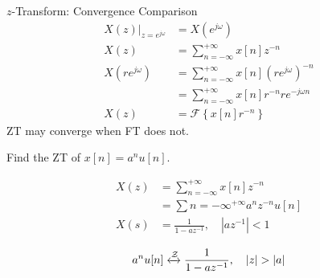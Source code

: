 \begin{frame}{$z$-Transform: Convergence Comparison}
    \begin{align*}
        \left.X(z)\right|_{z=e^{j\omega}} &= X(e^{j\omega})\\
        X(z) &= \sum_{n=-\infty}^{+\infty}x[n]z^{-n}\\
        X(re^{j\omega}) &= \sum_{n=-\infty}^{+\infty}x[n]\left(re^{j\omega}\right)^{-n}\\
        &= \sum_{n=-\infty}^{+\infty}x[n]r^{-n}re^{-j\omega n}\\
        X(z) &= \mathcal{F}\left\{ x[n]r^{-n}\right\}
    \end{align*}
    {
        ZT may converge when FT does not.
    }
\end{frame}

\begin{frame}[t]{}
    \begin{example}
        Find the ZT of
        $
            x[n] = a^nu[n].
        $
    \end{example}

    {
        \begin{solution}
        \end{solution}
            \begin{align*}
                X(z) &= \sum_{n=-\infty}^{+\infty}x[n]z^{-n}\\
                &= \sum{n=-\infty}^{+\infty}a^nz^{-n}u[n]\\
                X(s) &= \frac{1}{1-az^{-1}}, \quad |az^{-1}|< 1\\
            \end{align*}\pause
            \begin{equation*}
                a^nu[n] \xleftrightarrow{\mathcal{Z}}   \frac{1}{1-az^{-1}}, \quad |z|> |a|
            \end{equation*}
    }
\end{frame}





